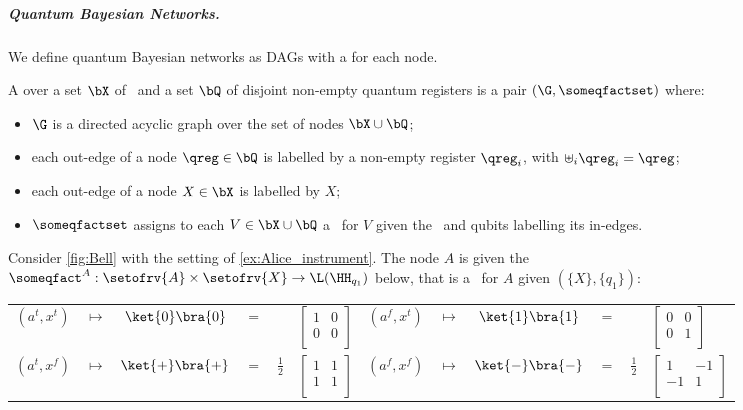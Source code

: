 \subparagraph{Quantum Bayesian Networks.}

We define quantum Bayesian networks as DAGs with a \qCPT for each node.

\begin{definition}
A  over a set $\bX$ of \rvs\ and a set $\bQ$ of disjoint non-empty quantum registers is a pair $(\G,\someqfactset)$ where:
\begin{itemize}
\item
$\G$ is a directed acyclic graph over the set of nodes $\bX\cup\bQ$;
\item
each out-edge of a node $\qreg\in\bQ$ is labelled by a non-empty register $\qreg_i$, with $\uplus_i \qreg_i = \qreg$;
\item
each out-edge of a node $X\in\bX$ is labelled by $X$;
\item
$\someqfactset$ assigns to each $V \in \bX\cup\bQ$ a \qCPT\ for $V$ given the \rvs\ and qubits labelling its in-edges.
\end{itemize}
\end{definition}

\begin{example}
Consider \cref{fig:Bell} with the setting of \cref{ex:Alice_instrument}.
The node $A$ is given the \qfactor\ $\someqfact^A: \setofrv{A}\times\setofrv{X} \to \L(\HH_{q_1})$ below, that is a \qCPT\ for $A$ given $(\{X\},\{q_1\})$:

\begin{adjustbox}{}
\begin{tabular}{ccc@{ }c@{ }l@{}l@{\qquad\qquad}ccc@{ }c@{ }l@{}l}
$(a^t,x^t)$ & $\mapsto$ & $\ket{0}\bra{0}$ & $=$ &
&
$\left[\begin{smallmatrix}
1 & 0\\
0 & 0\\
\end{smallmatrix}\right]$
&
$(a^f,x^t)$ & $\mapsto$ & $\ket{1}\bra{1}$ & $=$ &
&
$\left[\begin{smallmatrix}
0 & 0\\
0 & 1\\
\end{smallmatrix}\right]$
\\
$(a^t,x^f)$ & $\mapsto$ & $\ket{+}\bra{+}$ & $=$ &
$\frac{1}{2}$
&
$\left[\begin{smallmatrix}
1 & 1\\
1 & 1\\
\end{smallmatrix}\right]$
&
$(a^f,x^f)$ & $\mapsto$ & $\ket{-}\bra{-}$ & $=$ &
$\frac{1}{2}$
&
$\left[\begin{smallmatrix}
1 & -1\\
-1 & 1\\
\end{smallmatrix}\right]$
\end{tabular}
\end{adjustbox}
\end{example}

